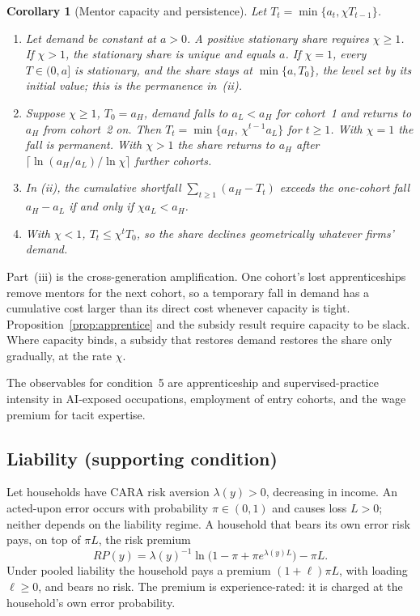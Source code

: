\documentclass[12pt]{article}
\newtheorem{corollary}{Corollary}
\theoremstyle{remark}
\begin{document}
\begin{corollary}[Mentor capacity and persistence]\label{cor:capacity}
Let $T_t=\min\{a_t,\chi T_{t-1}\}$.
\begin{enumerate}[label=(\roman*),itemsep=0pt]
\item Let demand be constant at $a>0$. A positive stationary share requires $\chi\ge1$. If $\chi>1$, the stationary share is unique and equals $a$. If $\chi=1$, every $T\in(0,a]$ is stationary, and the share stays at $\min\{a,T_0\}$, the level set by its initial value; this is the permanence in~(ii).
\item Suppose $\chi\ge1$, $T_0=a_H$, demand falls to $a_L<a_H$ for cohort~1 and returns to $a_H$ from cohort~2 on. Then $T_t=\min\{a_H,\,\chi^{t-1}a_L\}$ for $t\ge1$. With $\chi=1$ the fall is permanent. With $\chi>1$ the share returns to $a_H$ after $\lceil\ln(a_H/a_L)/\ln\chi\rceil$ further cohorts.
\item In (ii), the cumulative shortfall $\sum_{t\ge1}(a_H-T_t)$ exceeds the one-cohort fall $a_H-a_L$ if and only if $\chi a_L<a_H$.
\item With $\chi<1$, $T_t\le\chi^tT_0$, so the share declines geometrically whatever firms' demand.
\end{enumerate}
\end{corollary}

Part~(iii) is the cross-generation amplification. One cohort's lost apprenticeships remove mentors for the next cohort, so a temporary fall in demand has a cumulative cost larger than its direct cost whenever capacity is tight. Proposition~\ref{prop:apprentice} and the subsidy result require capacity to be slack. Where capacity binds, a subsidy that restores demand restores the share only gradually, at the rate $\chi$.

The observables for condition~5 are apprenticeship and supervised-practice intensity in AI-exposed occupations, employment of entry cohorts, and the wage premium for tacit expertise.

\subsection{Liability (supporting condition)}\label{sec:liability}

Let households have CARA risk aversion $\lambda(y)>0$, decreasing in income. An acted-upon error occurs with probability $\pi\in(0,1)$ and causes loss $L>0$; neither depends on the liability regime. A household that bears its own error risk pays, on top of $\pi L$, the risk premium
\[
RP(y)=\lambda(y)^{-1}\ln\!\big(1-\pi+\pi e^{\lambda(y)L}\big)-\pi L .
\]
Under pooled liability the household pays a premium $(1+\ell)\pi L$, with loading $\ell\ge0$, and bears no risk. The premium is experience-rated: it is charged at the household's own error probability.
\end{document}
